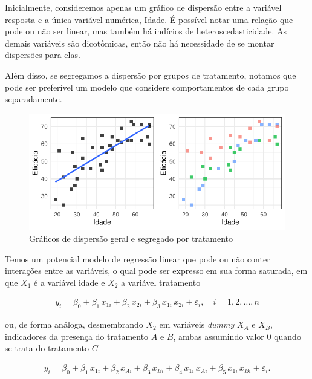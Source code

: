 \documentclass[
  letterpaper,
  DIV=11,
  numbers=noendperiod]{scrartcl}
\begin{document}
Inicialmente, consideremos apenas um gráfico de dispersão entre a
variável resposta e a única variável numérica, Idade. É possível notar
uma relação que pode ou não ser linear, mas também há indícios de
heteroscedasticidade. As demais variáveis são dicotômicas, então não há
necessidade de se montar dispersões para elas.

Além disso, se segregamos a dispersão por grupos de tratamento, notamos
que pode ser preferível um modelo que considere comportamentos de cada
grupo separadamente.

\begin{figure}

{\centering \includegraphics{lista2_files/figure-pdf/scatter-variaveis-1.pdf}

}

\caption{Gráficos de dispersão geral e segregado por tratamento}

\end{figure}

Temos um potencial modelo de regressão linear que pode ou não conter
interações entre as variáveis, o qual pode ser expresso em sua forma
saturada, em que \(X_1\) é a variável idade e \(X_2\) a variável
tratamento

\begin{align}
  y_i = \beta_0 + \beta_1 \, x_{1i} + \beta_2 \, x_{2i} + \beta_3 \, x_{1i}\, x_{2i} + \varepsilon_i, \quad i = 1, 2, \dots, n
\end{align}

ou, de forma análoga, desmembrando \(X_2\) em variáveis \emph{dummy}
\(X_A\) e \(X_B\), indicadores da presença do tratamento \(A\) e \(B\),
ambas assumindo valor \(0\) quando se trata do tratamento \(C\)

\begin{align}
  y_i = \beta_0 + \beta_1 \, x_{1i} + \beta_2 \, x_{Ai} + \beta_3 \, x_{Bi} + \beta_4 \, x_{1i} \, x_{Ai} + \beta_5 \, x_{1i} \, x_{Bi} + \varepsilon_i. \label{modelo_dummy}
\end{align}
\end{document}

